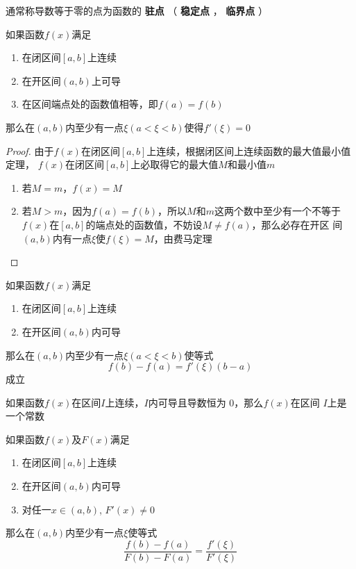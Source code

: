 \documentclass[11pt]{article}
\begin{document}
通常称导数等于零的点为函数的 \textbf{驻点} （ \textbf{稳定点} ， \textbf{临界点}  ）
\begin{theorem}[罗尔定理]
如果函数\(f(x)\)满足
\begin{enumerate}
\item 在闭区间\([a,b]\)上连续
\item 在开区间\((a,b)\)上可导
\item 在区间端点处的函数值相等，即\(f(a)=f(b)\)
\end{enumerate}


那么在\((a,b)\)内至少有一点\(\xi(a<\xi<b)\)使得\(f'(\xi)=0\)
\end{theorem}

\begin{proof}
由于\(f(x)\)在闭区间\([a,b]\)上连续，根据闭区间上连续函数的最大值最小值定理，
\(f(x)\)在闭区间\([a,b]\)上必取得它的最大值\(M\)和最小值\(m\)

\begin{enumerate}
\item 若\(M=m\)，\(f(x)=M\)
\item 若\(M>m\)，因为\(f(a)=f(b)\)，所以\(M\)和\(m\)这两个数中至少有一个不等于
\(f(x)\)在\([a,b]\)的端点处的函数值，不妨设\(M\neq f(a)\)，那么必存在开区
间\((a,b)\)内有一点\(\xi\)使\(f(\xi)=M\)，由费马定理
\end{enumerate}
\end{proof}

\begin{theorem}[拉格朗日中值定理]
如果函数\(f(x)\)满足
\begin{enumerate}
\item 在闭区间\([a,b]\)上连续
\item 在开区间\((a,b)\)内可导
\end{enumerate}


那么在\((a,b)\)内至少有一点\(\xi(a<\xi<b)\)使等式
\begin{equation*}
f(b)-f(a)=f'(\xi)(b-a)
\end{equation*}
成立
\end{theorem}

\begin{theorem}[]
如果函数\(f(x)\)在区间\(I\)上连续，\(I\)内可导且导数恒为 0，那么\(f(x)\)在区间
\(I\)上是一个常数
\end{theorem}

\begin{theorem}[柯西中值定理]
如果函数\(f(x)\)及\(F(x)\)满足
\begin{enumerate}
\item 在闭区间\([a,b]\)上连续
\item 在开区间\((a,b)\)内可导
\item 对任一\(x\in(a,b)\), \(F'(x)\neq0\)
\end{enumerate}


那么在\((a,b)\)内至少有一点\(\xi\)使等式
\begin{equation*}
\frac{f(b)-f(a)}{F(b)-F(a)}=\frac{f'(\xi)}{F'(\xi)}
\end{equation*}
\end{theorem}
\end{document}
